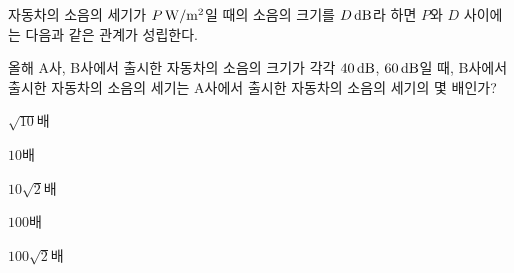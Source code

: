 자동차의 소음의 세기가 $P\mkern3mu \mathrm{W/m^2}$일 때의 소음의 크기를 $D\mkern3mu \mathrm{dB}$라 하면 $P$와 $D$ 사이에는 다음과 같은 관계가 성립한다. \par\smallskip{}\par\smallskip\noindent 올해 A사, B사에서 출시한 자동차의 소음의 크기가 각각 $40\mkern3mu \mathrm{dB}$, $60\mkern3mu \mathrm{dB}$일 때, B사에서 출시한 자동차의 소음의 세기는 A사에서 출시한 자동차의 소음의 세기의 몇 배인가?
\begin{choices32}{\rule[-3ex]{0pt}{8ex}$\sqrt{10}$배}{\rule[-3ex]{0pt}{8ex}$10$배}{\rule[-3ex]{0pt}{8ex}$10\sqrt{2}$배}{\rule[-3ex]{0pt}{8ex}$100$배}{\rule[-3ex]{0pt}{8ex}$100\sqrt{2}$배}\end{choices32}
